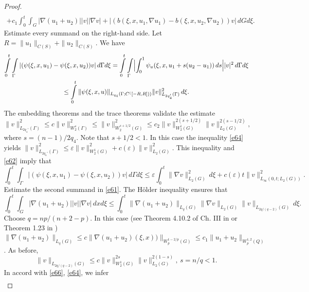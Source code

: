 \documentclass{article}
\theoremstyle{plain}
\begin{document}
\begin{proof}
\begin{multline}
\\ + c_1\int_0^t\int_G|\nabla (u_{1}+u_{2})| |v||\nabla v| +|(b(\xi,x,u_1,\nabla u_1)-b(\xi,x,u_2,\nabla u_2))v|\,dGd\xi. 
\end{multline}
Estimate every summand on the right-hand side. Let $R=\|u_1\|_{C(S)}+\|u_2\|_{C(S)}$. 
We have
\begin{multline}\label{e62}
\int\limits_0^t \int\limits_{\Gamma}|(\psi(\xi,x,u_1)-\psi(\xi,x,u_2))v|\,d\Gamma d\xi=
\int\limits_0^t \int\limits_{\Gamma}\Bigl|\int_0^1\psi_u(\xi,x,u_1+s(u_2-u_1))\,ds\Bigr| |v|^2\,d\Gamma d\xi \\ \leq  \int\limits_0^t \|\psi(\xi,x,u)\|_{L_{q_4}(\Gamma;C^([-R,R]))}\|v\|_{L_{2 q_4'}(\Gamma)}^2\, d\xi.
\end{multline}
The embedding theorems  \cite[Lemma 1.14]{pya11} and the trace theorems  \cite[Lemma 1.9]{pya11}  validate the estimate 
\begin{equation}\label{e63}
\|v\|_{L_{2 q_4'}(\Gamma)}^2\leq c \|v\|_{W_{2}^s(\Gamma)}^2\leq \|v\|_{W_{2}^{s+1/2}(G)}^2\leq c_2 \|v\|_{W_{2}^{1}(G)}^{2(s+1/2)}\|v\|_{L_{2}(G)}^{2(s-1/2)},
\end{equation}
where $s=(n-1)/2q_4$. Note that  $s+1/2<1$. In this case the inequality  \eqref{e64} yields 
  $\|v\|_{L_{2 q_4'}(\Gamma)}^2\leq \varepsilon \|v\|_{W_{2}^{1}(G)}^{2}+c(\varepsilon) \|v\|_{L_{2}(G)}^{2}$. This inequality and  \eqref{e62} imply that 
 \begin{equation}\label{e65}
 \int_0^t \int_{\Gamma}|(\psi(\xi,x,u_1)-\psi(\xi,x,u_2))v|\,d\Gamma d\xi\leq   \varepsilon \int_0^t \|\nabla v\|_{L_2(G)}^2\,d\xi + c(\varepsilon) t  \|v\|_{L_{\infty}(0,t;L_2(G))}^{2}. 
 \end{equation} 
 Estimate the second summand in  \eqref{e61}. The H\"{o}lder inequality ensures that 
  \begin{equation}\label{e66}
 \int_0^t\int_G|\nabla (u_{1}+u_{2})| |v||\nabla v|\, dxd\xi \leq  \int_0^t\|\nabla (u_{1}+u_{2})\|_{L_q(G)} \|\nabla v\|_{L_2(G)}\| v\|_{L_{2q/(q-2)}(G)}\,d\xi.
 \end{equation} 
 Choose $q=np/(n+2-p)$. In this case  (see Theorem 4.10.2 of Ch. III in \cite{ama1} or Theorem  1.23 in \cite{pya11}) 
 $\|\nabla (u_{1}+u_{2})\|_{L_q(G)}\leq c \|\nabla (u_{1}+u_{2})(\xi,x))\|_{W_p^{1-2/p}(G)}\leq c_1\|u_{1}+u_{2}\|_{W_p^{1,2}(Q)}$.
 As before,  
 $$
 \| v\|_{L_{2q/(q-2)}(G)}\leq  c\|v\|_{W_{2}^{1}(G)}^{2s}\|v\|_{L_{2}(G)}^{2(1-s)}, \  s=n/q<1.
 $$
 In accord with  \eqref{e66}, \eqref{e64}, we infer 
  \begin{multline}\label{e671}

\end{multline}
\end{proof}
\end{document}
